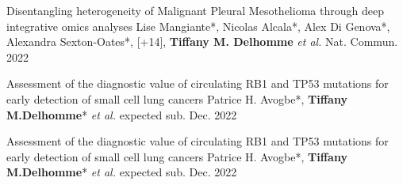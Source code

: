 \begin{cventries}
 
     \cvpublicationentry
    {} %
    {Disentangling heterogeneity of Malignant Pleural Mesothelioma through deep integrative omics analyses} %
    {Lise Mangiante*, Nicolas Alcala*, Alex Di Genova*, Alexandra Sexton-Oates*, [+14], \textbf{Tiffany M. Delhomme} \textit{et al.}} %
    {}
    {Nat. Commun. 2022} %
    {}     
    

    \cvpublicationentry
    {} %
    {Assessment of the diagnostic value of circulating RB1 and
TP53 mutations for early detection of small cell lung cancers} %
    {Patrice H. Avogbe*, \textbf{Tiffany M.Delhomme}* \textit{et al.}} %
    {}
    {expected sub. Dec. 2022} %
    {}

    \cvpublicationentry
    {} %
    {Assessment of the diagnostic value of circulating RB1 and
TP53 mutations for early detection of small cell lung cancers} %
    {Patrice H. Avogbe*, \textbf{Tiffany M.Delhomme}* \textit{et al.}} %
    {}
    {expected sub. Dec. 2022} %
    {}
\end{cventries}
